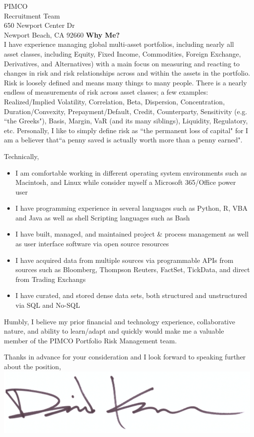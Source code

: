 \documentclass{letter}
\begin{document}
\begin{letter}{
  PIMCO \\
  Recruitment Team \\
  650 Newport Center Dr \\
  Newport Beach, CA 92660
}
\textbf{Why Me?} \\
I have experience managing global multi-asset portfolios, including nearly all
asset classes, including Equity, Fixed Income, Commodities, Foreign Exchange, 
Derivatives, and Alternatives) with a main focus on measuring and
reacting to changes in risk and risk relationships across and within the
assets in the portfolio. Risk is loosely defined and means many things to many people.
There is a nearly endless of measurements of risk across asset classes; a few examples:
Realized/Implied Volatility, Correlation, Beta, Dispersion, Concentration,
Duration/Convexity, Prepayment/Default, Credit, Counterparty, Sensitivity (e.g.
``the Greeks"), Basis, Margin, VaR (and its many siblings), Liquidity, Regulatory,
etc. Personally, I like to simply define risk as ``the permanent loss of capital" for
I am a believer that``a penny saved is actually worth more than a penny earned".

\newpage

Technically,
\begin{itemize}
  \item I am comfortable working in different operating system environments such
  as Macintosh, and Linux while consider myself a Microsoft 365/Office power user
  \item I have programming experience in several languages such as Python, R, VBA
  and Java as well as shell Scripting languages such as Bash
  \item I have built, managed, and maintained project \& process management as well
  as user interface software via open source resources
  \item I have acquired data from multiple sources via programmable APIs from sources
  such as Bloomberg, Thompson Reuters, FactSet, TickData, and direct from Trading Exchangs
  \item I have curated, and stored dense data sets, both structured and unstructured
  via SQL and No-SQL 
\end{itemize}
Humbly, I believe my prior financial and technology experience, collaborative nature,
and ability to learn/adapt and quickly would make me a valuable member of the PIMCO
Portfolio Risk Management team.
 
\closing{
  Thanks in advance for your consideration and I look forward to speaking further
  about the position, \\
  \vspace{.33in}
  \includegraphics[scale=0.33]{signature.png}
}

\end{letter}
\end{document}
